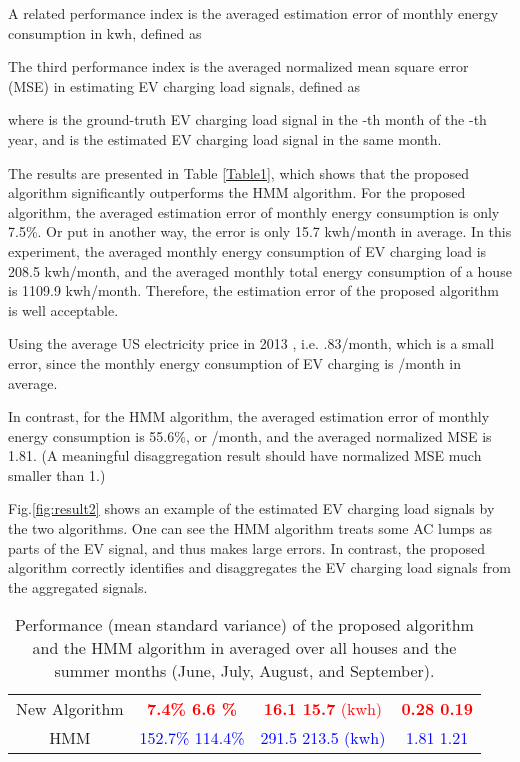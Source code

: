 \documentclass[conference]{IEEEtran}
\begin{document}
A related performance index is the averaged estimation error of monthly energy consumption in kwh, defined as



The third performance index is the averaged normalized mean square error (MSE) in estimating EV charging load signals, defined as

where  is the ground-truth EV charging load signal in the -th month of the -th year, and  is the estimated EV charging load signal in the same month.

The results are presented in Table \ref{Table1}, which shows that the proposed algorithm significantly outperforms the HMM algorithm. For the proposed algorithm, the averaged estimation error of monthly energy consumption is only 7.5\%. Or put in another way, the error is only 15.7 kwh/month in average. In this experiment, the averaged monthly energy consumption of EV charging load is 208.5 kwh/month, and the averaged monthly total energy consumption of a house is 1109.9 kwh/month. Therefore, the estimation error of the proposed algorithm is well acceptable.

Using the average US electricity price in 2013 \cite{price}, i.e. \1.83/month, which is a small error, since the monthly energy consumption of EV charging is /month in average.

In contrast, for the HMM algorithm, the averaged estimation error of monthly energy consumption is 55.6\%, or /month, and the averaged normalized MSE is 1.81. (A meaningful disaggregation result should have normalized MSE much smaller than 1.)


Fig.\ref{fig:result2} shows an example of the estimated EV charging load signals by the two algorithms. One can see the HMM algorithm treats some AC lumps as parts of the EV signal, and thus makes large errors. In contrast, the proposed algorithm correctly identifies and disaggregates the EV charging load signals from the aggregated signals.




\begin{table}[t]
\caption{Performance (mean  standard variance) of the proposed algorithm and the HMM algorithm in \cite{parson2012non} averaged over all houses and the summer months (June, July, August, and September). }
\label{Table2}
\centering
\begin{tabular}{c|c|c|c}
\hline\hline
            &           &           &      \\
\hline
New Algorithm              &   \textcolor{red}{\textbf{7.4\%  6.6 \%}}       & \textcolor{red}{\textbf{16.1  15.7} (kwh) }        & \textcolor{red}{\textbf{0.28  0.19} }          \\ \hline
HMM \cite{parson2012non}   &    \textcolor{blue}{152.7\%  114.4\% }      & \textcolor{blue}{ 291.5  213.5 (kwh)}   &  \textcolor{blue}{1.81  1.21 }                  \\
\hline\hline
\end{tabular}
\end{table}
\end{document}
